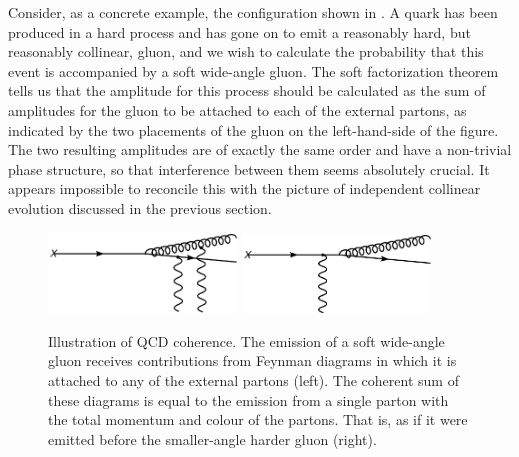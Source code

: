Consider, as a concrete example, the configuration shown in
.  A quark has been produced in a hard
process and has gone on to emit a reasonably hard, but reasonably
collinear, gluon, and we wish to calculate the probability that this
event is accompanied by a soft wide-angle gluon.  The soft factorization
theorem tells us that the amplitude for this process should be
calculated as the sum of amplitudes for the gluon to be attached to each
of the external partons, as indicated by the two placements of the gluon
on the left-hand-side of the figure.  The two resulting amplitudes are
of exactly the same order and have a non-trivial phase structure, so
that interference between them seems absolutely crucial.  It appears
impossible to reconcile this with the picture of independent collinear
evolution discussed in the previous section.
\begin{figure}
  \centerline{%
    \includegraphics[width=5cm]{parton-showers/coherence1.pdf}
    \hfill
    \includegraphics[width=5cm]{parton-showers/coherence2.pdf}}
  \caption{Illustration of QCD coherence. The emission of a soft
    wide-angle gluon receives contributions from Feynman diagrams in
    which it is attached to any of the external partons (left). The
    coherent sum of these diagrams is equal to the emission from a
    single parton with the total momentum and colour of the
    partons. That is, as if it were emitted before the smaller-angle
    harder gluon (right).}
  \label{fig:softgluoncoherence}
\end{figure}

